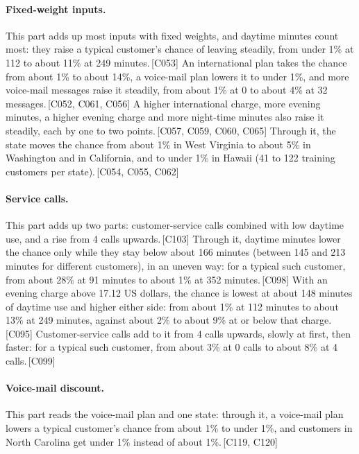 \documentclass[a4paper,10pt]{article}
\newif\ifreviewmarks
\newcommand{\reviewrule}{\noindent{\color{BrickRed}\rule{\linewidth}{0.8pt}}}
\newenvironment{drafted}[1][]{%
  \ifreviewmarks\par\addvspace{\medskipamount}\reviewrule\par\nopagebreak
  \noindent{\color{BrickRed}\sffamily\footnotesize\textbf{Thesis Draft}\quad #1\hfill review}\par\nopagebreak\smallskip\fi}{%
  \ifreviewmarks\par\smallskip\noindent{\color{BrickRed}\sffamily\footnotesize end of thesis draft}\par\nopagebreak\reviewrule\par\medskip\fi}
\begin{document}
\begin{drafted}[plain-language layer: churn100-s2-c2]
\paragraph{Fixed-weight inputs.} This part adds up most inputs with fixed weights, and daytime minutes count most: they raise a typical customer's chance of leaving steadily, from under 1\% at 112 to about 11\% at 249 minutes.\,{\scriptsize\textcolor{NavyBlue}{[C053]}} An international plan takes the chance from about 1\% to about 14\%, a voice-mail plan lowers it to under 1\%, and more voice-mail messages raise it steadily, from about 1\% at 0 to about 4\% at 32 messages.\,{\scriptsize\textcolor{NavyBlue}{[C052, C061, C056]}} A higher international charge, more evening minutes, a higher evening charge and more night-time minutes also raise it steadily, each by one to two points.\,{\scriptsize\textcolor{NavyBlue}{[C057, C059, C060, C065]}} Through it, the state moves the chance from about 1\% in West Virginia to about 5\% in Washington and in California, and to under 1\% in Hawaii (41 to 122 training customers per state).\,{\scriptsize\textcolor{NavyBlue}{[C054, C055, C062]}}
\paragraph{Service calls.} This part adds up two parts: customer-service calls combined with low daytime use, and a rise from 4 calls upwards.\,{\scriptsize\textcolor{NavyBlue}{[C103]}} Through it, daytime minutes lower the chance only while they stay below about 166 minutes (between 145 and 213 minutes for different customers), in an uneven way: for a typical such customer, from about 28\% at 91 minutes to about 1\% at 352 minutes.\,{\scriptsize\textcolor{NavyBlue}{[C098]}} With an evening charge above 17.12 US dollars, the chance is lowest at about 148 minutes of daytime use and higher either side: from about 1\% at 112 minutes to about 13\% at 249 minutes, against about 2\% to about 9\% at or below that charge.\,{\scriptsize\textcolor{NavyBlue}{[C095]}} Customer-service calls add to it from 4 calls upwards, slowly at first, then faster: for a typical such customer, from about 3\% at 0 calls to about 8\% at 4 calls.\,{\scriptsize\textcolor{NavyBlue}{[C099]}}
\paragraph{Voice-mail discount.} This part reads the voice-mail plan and one state: through it, a voice-mail plan lowers a typical customer's chance from about 1\% to under 1\%, and customers in North Carolina get under 1\% instead of about 1\%.\,{\scriptsize\textcolor{NavyBlue}{[C119, C120]}}

\end{drafted}
\end{document}
